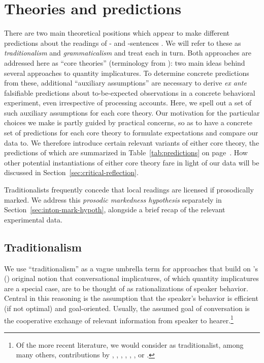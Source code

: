 \documentclass[fleqn,reqno,10pt]{article}
\newcommand{\as}{\acro{as}}
\renewcommand{\es}{\acro{es}}
\begin{document}
\section{Theories and predictions}
\label{sec:theories-predictions}

There are two main theoretical positions which appear to make
different predictions about the readings of \as- and \es-sentences
\citep[see][for
overview]{Horn2006:The-Border-Wars,Geurts2010:Quantity-Implic,Sauerland2012:The-Computation,ChemlaSingh2014:Remarks-on-the-}. We
will refer to these as \emph{traditionalism} and \emph{grammaticalism}
and treat each in turn. Both approaches are addressed here as ``core
theories'' (terminology from
\citeauthor{ChemlaSingh2014:Remarks-on-the-}): two main ideas behind
several approaches to quantity implicatures. To determine concrete
predictions from these, additional ``auxiliary assumptions'' are
necessary to derive \emph{ex ante} falsifiable predictions about
to-be-expected observations in a concrete behavioral experiment, even
irrespective of processing accounts. Here, we spell out a set of such
auxiliary assumptions for each core theory. Our motivation for the
particular choices we make is partly guided by practical concerns, so
as to have a concrete set of predictions for each core theory to
formulate expectations and compare our data to. We therefore introduce
certain relevant variants of either core theory, the predictions of
which are summarized in Table~\ref{tab:predictions} on
page~\pageref{tab:predictions}. How other potential instantiations of
either core theory fare in light of our data will be discussed in
Section~\ref{sec:critical-reflection}.

Traditionalists frequently concede that local readings are licensed if
prosodically marked. We address this \emph{prosodic markedness
  hypothesis} separately in Section~\ref{sec:inton-mark-hypoth},
alongside a brief recap of the relevant experimental data.

\subsection{Traditionalism}
\label{sec:traditionalism}

We use ``traditionalism'' as a vague umbrella term for approaches that
build on \citeauthor{Grice1975:Logic-and-Conve}'s
(\citeyear{Grice1975:Logic-and-Conve}) original notion that
conversational implicatures, of which quantity implicatures are a
special case, are to be thought of as rationalizations of speaker
behavior. Central in this reasoning is the assumption that the
speaker's behavior is efficient (if not optimal) and
goal-oriented. Usually, the assumed goal of conversation is the
cooperative exchange of relevant information from speaker to
hearer.\footnote{Of the more recent literature, we would consider as
  traditionalist, among many others, contributions by
  \citet{Spector2006:Scalar-Implicat},
  \citet{Sauerland2004:Scalar-Implicat},
  \citet{Russell2006:Against-Grammat},
  \citet{vanRooijSchulz:ExhaustiveInterpretation},
  \citet{Geurts2010:Quantity-Implic},
  \citet{Franke2011:Quantity-Implic}, or
  \citet{GoodmanStuhlmuller2013:Knowledge-and-I}.}
\end{document}

